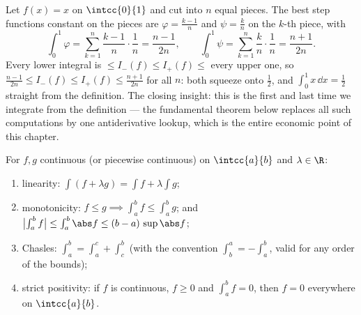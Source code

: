 \begin{example}\label{ex:b1:integration:defcompute}
Let $f(x) = x$ on $\intcc{0}{1}$ and cut into $n$ equal pieces.
The best step functions constant on the pieces are $\varphi =
\frac{k-1}{n}$ and $\psi = \frac kn$ on the $k$-th piece, with
\[
\int_0^1 \varphi = \sum_{k=1}^{n} \frac{k-1}{n}\cdot\frac1n
= \frac{n-1}{2n},
\qquad
\int_0^1 \psi = \sum_{k=1}^{n} \frac{k}{n}\cdot\frac1n
= \frac{n+1}{2n} .
\]
Every lower integral is $\leq I_-(f) \leq I_+(f) \leq$ every
upper one, so $\frac{n-1}{2n} \leq I_-(f) \leq I_+(f) \leq
\frac{n+1}{2n}$ for all $n$: both squeeze onto $\frac12$, and
$\int_0^1 x\,\dd x = \frac12$ straight from the definition. The
closing insight: this is the first and last time we integrate
from the definition --- the fundamental theorem below replaces
all such computations by one antiderivative lookup, which is
the entire economic point of this chapter.
\end{example}

\begin{theorem}[Properties]\label{thm:b1:integration:props}
For $f, g$ continuous (or piecewise continuous) on $\intcc{a}{b}$ and
$\lambda \in \R$:
\begin{enumerate}
  \item linearity: $\int (f + \lambda g) = \int f + \lambda \int g$;
  \item monotonicity: $f \leq g \implies \int_a^b f \leq \int_a^b g$;
        and $\bigl|\int_a^b f\bigr| \leq \int_a^b \abs f \leq (b -
        a)\, \sup\abs f$;
  \item Chasles: $\int_a^b = \int_a^c + \int_c^b$ (with the
        convention $\int_b^a = -\int_a^b$, valid for any order of
        the bounds);
  \item strict positivity: if $f$ is continuous, $f \geq 0$ and
        $\int_a^b f = 0$, then $f = 0$ everywhere on
        $\intcc{a}{b}$.
\end{enumerate}
\end{theorem}

